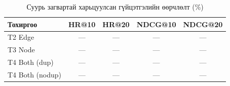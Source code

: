 \begin{table}[h]
\centering
\caption{Суурь загвартай харьцуулсан гүйцэтгэлийн өөрчлөлт (\%)}
\label{tab:improvements}
\begin{tabular}{lcccc}
\toprule
\textbf{Тохиргоо} & \textbf{HR@10} & \textbf{HR@20} & \textbf{NDCG@10} & \textbf{NDCG@20} \\
\midrule
T2 Edge & --- & --- & --- & --- \\
T3 Node & --- & --- & --- & --- \\
T4 Both (dup) & --- & --- & --- & --- \\
T4 Both (nodup) & --- & --- & --- & --- \\
\bottomrule
\end{tabular}
\end{table}